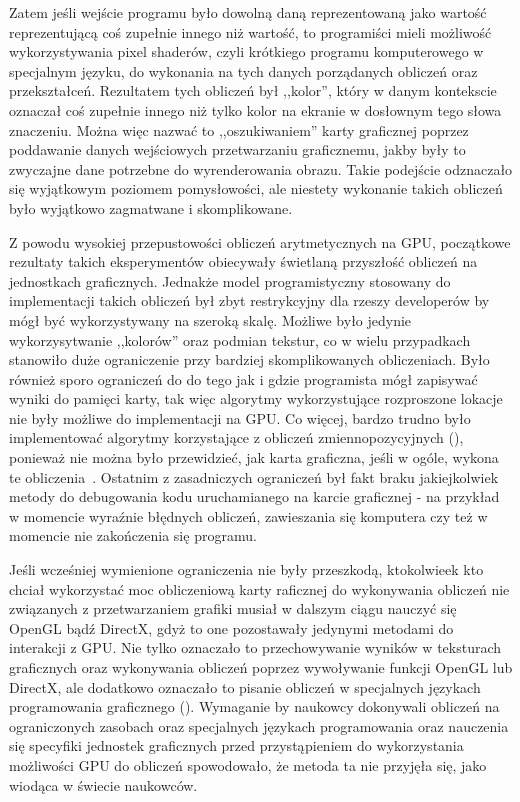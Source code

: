 Zatem jeśli wejście programu było dowolną daną reprezentowaną jako wartość reprezentującą coś zupełnie innego niż wartość, to programiści mieli możliwość wykorzystywania pixel shaderów, czyli krótkiego programu komputerowego w specjalnym języku, do wykonania na tych danych porządanych obliczeń oraz przekształceń. Rezultatem tych obliczeń był ,,kolor'', który w danym kontekscie oznaczał coś zupełnie innego niż tylko kolor na ekranie w dosłownym tego słowa znaczeniu. Można więc nazwać to ,,oszukiwaniem'' karty graficznej poprzez poddawanie danych wejściowych przetwarzaniu graficznemu, jakby były to zwyczajne dane potrzebne do wyrenderowania obrazu. Takie podejście odznaczało się wyjątkowym poziomem pomysłowości, ale niestety wykonanie takich obliczeń było wyjątkowo zagmatwane i skomplikowane.

Z powodu wysokiej przepustowości obliczeń arytmetycznych na GPU, początkowe rezultaty takich eksperymentów obiecywały świetlaną przyszłość obliczeń na jednostkach graficznych. Jednakże model programistyczny stosowany do implementacji takich obliczeń był zbyt restrykcyjny dla rzeszy developerów by mógł być wykorzystywany na szeroką skalę. Możliwe było jedynie wykorzysytwanie ,,kolorów'' oraz podmian tekstur, co w wielu przypadkach stanowiło duże ograniczenie przy bardziej skomplikowanych obliczeniach. Było również sporo ograniczeń do do tego jak i gdzie programista mógł zapisywać wyniki do pamięci karty, tak więc algorytmy wykorzystujące rozproszone lokacje nie były możliwe do implementacji na GPU. Co więcej, bardzo trudno było implementować algorytmy korzystające z obliczeń zmiennopozycyjnych (), ponieważ nie można było przewidzieć, jak karta graficzna, jeśli w ogóle, wykona te obliczenia~\cite{Cuda:Example}. Ostatnim z zasadniczych ograniczeń był fakt braku jakiejkolwiek metody do debugowania kodu uruchamianego na karcie graficznej - na przykład w momencie wyraźnie błędnych obliczeń, zawieszania się komputera czy też w momencie nie zakończenia się programu.

Jeśli wcześniej wymienione ograniczenia nie były przeszkodą, ktokolwieek kto chciał wykorzystać moc obliczeniową karty raficznej do wykonywania obliczeń nie związanych z przetwarzaniem grafiki musiał w dalszym ciągu nauczyć się OpenGL bądź DirectX, gdyż to one pozostawały jedynymi metodami do interakcji z GPU. Nie tylko oznaczało to przechowywanie wyników w teksturach graficznych oraz wykonywania obliczeń poprzez wywoływanie funkcji OpenGL lub DirectX, ale dodatkowo oznaczało to pisanie obliczeń w specjalnych językach programowania graficznego (). Wymaganie by naukowcy dokonywali obliczeń na ograniczonych zasobach oraz specjalnych językach programowania oraz nauczenia się specyfiki jednostek graficznych przed przystąpieniem do wykorzystania możliwości GPU do obliczeń spowodowało, że metoda ta nie przyjęła się, jako wiodąca w świecie naukowców.

